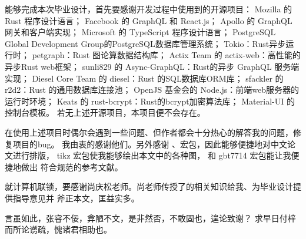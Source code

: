 \begin{arigatou}
    能够完成本次毕业设计，首先要感谢开发过程中使用到的开源项目：
    Mozilla 的 Rust 程序设计语言；
    Facebook 的 GraphQL 和 React.js；
    Apollo 的 GraphQL 网关和客户端实现；
    Microsoft 的 TypeScript 程序设计语言；
    PostgreSQL Global Development Group的PostgreSQL数据库管理系统；
    Tokio：Rust异步运行时；
    petgraph：Rust 图论算数据结构库；
    Actix Team 的 actix-web：高性能的异步Rust web框架；
    sunli829 的 Async-GraphQL：Rust的异步 GraphQL 服务端实现；
    Diesel Core Team 的 diesel：Rust 的SQL数据库ORM库；
    sfackler 的 r2d2：Rust 的通用数据库连接池；
    OpenJS 基金会的 Node.js：前端web服务器的运行时环境；
    Keats 的 rust-bcrypt：Rust的bcrypt加密算法库；
    Material-UI 的控制台模板。
    若无上述开源项目，本项目便不会存在。

    在使用上述项目时偶尔会遇到一些问题、但作者都会十分热心的解答我的问题，修复项目的bug。
    我由衷的感谢他们。另外感谢 、\CTeX 宏包，因此能够便捷地对中文论文进行排版，
    tikz 宏包使我能够绘出本文中的各种图， 和 gbt7714 宏包能让我便捷地做出
    符合规范的参考文献。

    就计算机联锁，要感谢尚庆松老师。尚老师传授了的相关知识给我、为毕业设计提供指导意见并
    斧正本文，匡益实多。

    言虽如此，张睿不佞，弇陋不文，是非然否，不敢固也，遑论致谢？
    求早日付梓而所论谫疏，愧诸君相助也。
\end{arigatou}